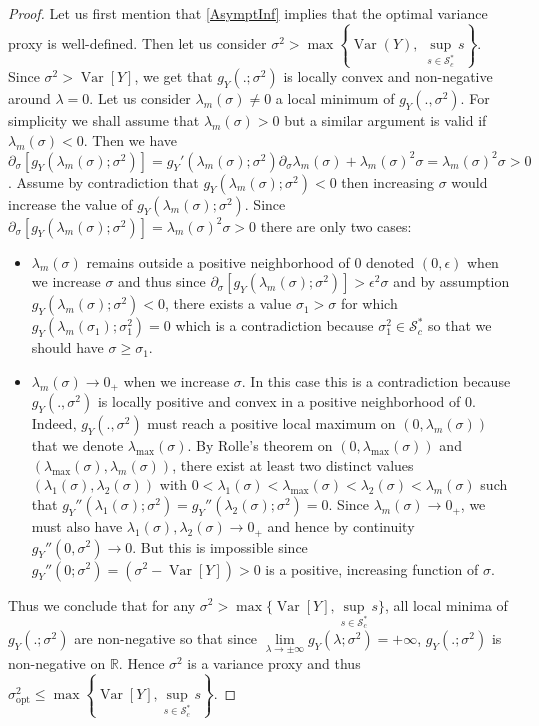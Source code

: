\documentclass[a4paper, 10pt]{article}
\theoremstyle{definition}
\begin{document}
\begin{proof}Let us first mention that \autoref{AsymptInf} implies that the optimal variance proxy is well-defined. Then let us consider $\sigma^2>\max\left\{ \operatorname{Var}(Y),\; \underset{s \in \mathcal{S}_c^*}{\sup} s \right\}$. Since $\sigma^2>\operatorname{Var}[Y]$, we get that $g_Y(.;\sigma^2)$ is locally convex and non-negative around $\lambda=0$.  Let us consider $\lambda_m(\sigma)\neq 0$ a local minimum of $g_Y(.,\sigma^2)$. For simplicity we shall assume that $\lambda_m(\sigma)>0$ but a similar argument is valid if $\lambda_m(\sigma)<0$. Then we have $\partial_{\sigma}[g_Y(\lambda_m(\sigma);\sigma^2)]= g_Y'(\lambda_m(\sigma);\sigma^2) \partial_\sigma \lambda_m(\sigma) + \lambda_m(\sigma)^2\sigma= \lambda_m(\sigma)^2\sigma>0$. Assume by contradiction that $g_Y(\lambda_m(\sigma);\sigma^2)<0$ then increasing $\sigma$ would increase the value of $g_Y(\lambda_m(\sigma);\sigma^2)$. Since $\partial_{\sigma}[g_Y(\lambda_m(\sigma);\sigma^2)]=\lambda_m(\sigma)^2\sigma>0$ there are only two cases: 
\begin{itemize}\item $\lambda_m(\sigma)$ remains outside a positive neighborhood of $0$ denoted $(0,\epsilon)$ when we increase $\sigma$ and thus since $\partial_{\sigma}[g_Y(\lambda_m(\sigma);\sigma^2)]>\epsilon^2 \sigma$ and by assumption $g_Y(\lambda_m(\sigma);\sigma^2)<0$, there exists a value $\sigma_1>\sigma$ for which $g_Y(\lambda_m(\sigma_1);\sigma_1^2)=0$ which is a contradiction because $\sigma_1^2\in \mathcal{S}_c^*$ so that we should have $\sigma\geq \sigma_1$.
\item $\lambda_m(\sigma)\to 0_+$ when we increase $\sigma$. In this case this is a contradiction because $g_Y(.,\sigma^2)$ is locally positive and convex in a positive neighborhood of $0$. Indeed, $g_Y(.,\sigma^2)$ must reach a positive local maximum on $(0,\lambda_m(\sigma))$ that we denote $\lambda_{\text{max}}(\sigma)$. By Rolle's theorem on $(0,\lambda_{\text{max}}(\sigma))$ and $(\lambda_{\text{max}}(\sigma),\lambda_m(\sigma))$, there exist at least two distinct values $(\lambda_1(\sigma),\lambda_2(\sigma))$ with $0<\lambda_1(\sigma)<\lambda_{\text{max}}(\sigma)<\lambda_2(\sigma)<\lambda_m(\sigma)$ such that $g_Y''(\lambda_1(\sigma);\sigma^2)=g_Y''(\lambda_2(\sigma);\sigma^2)=0$. Since $\lambda_m(\sigma)\to 0_+$, we must also have $\lambda_1(\sigma),\lambda_2(\sigma)\to 0_+$ and hence by continuity $g_Y''(0,\sigma^2)\to 0$. But this is impossible since $g_Y''(0;\sigma^2)=(\sigma^2-\operatorname{Var}[Y])>0$ is a positive, increasing function of $\sigma$. 
\end{itemize}
Thus we conclude that for any $\sigma^2>\max\{\operatorname{Var}[Y],\underset{s\in \mathcal{S}_c^*}{\sup} s\}$, all local minima of $g_Y(.;\sigma^2)$ are non-negative so that since $\underset{\lambda\to \pm \infty}{\lim} g_Y(\lambda;\sigma^2)=+\infty$, $g_Y(.;\sigma^2)$ is non-negative on $\mathbb{R}$. Hence $\sigma^2$ is a variance proxy and thus $\sigma_{\mathrm{opt}}^2\leq \max\left\{\operatorname{Var}[Y],\underset{s\in \mathcal{S}_c^*}{\sup} s\right\}$.


\end{proof}
\end{document}

